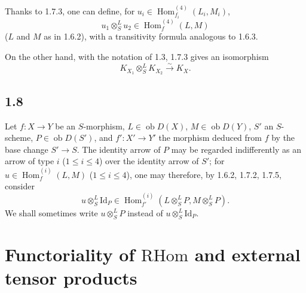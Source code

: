 \documentclass[11pt]{article}
\DeclareMathOperator{\Hom}{Hom}
\newcommand{\ob}{\operatorname{ob}}
\providecommand{\RHom}{\mathrm{RHom}}
\providecommand{\Id}{\mathrm{Id}}
\providecommand{\RHom}{\mathrm{RHom}}
\providecommand{\Hom}{\operatorname{Hom}}
\providecommand{\ob}{\operatorname{ob}}
\providecommand{\RHom}{\mathrm R\mathcal{H}om}
\providecommand{\RHom}{\mathrm{RHom}}
\begin{document}
Thanks to 1.7.3, one can define, for $u_i\in\Hom_{f_i}^{(4)}(L_i,M_i)$,
\begin{equation}\tag{1.7.5}
u_1\otimes^L_Su_2\in\Hom_f^{(4)}(L,M)
\end{equation}
($L$ and $M$ as in 1.6.2), with a transitivity formula analogous to 1.6.3.

On the other hand, with the notation of 1.3, 1.7.3 gives an isomorphism
\begin{equation}\tag{1.7.6}
K_{X_1}\otimes^L_SK_{X_2}\xrightarrow{\sim}K_X.
\end{equation}

\subsection*{1.8}
Let $f:X\to Y$ be an $S$-morphism, $L\in\ob D(X)$, $M\in\ob D(Y)$, $S'$ an $S$-scheme, $P\in\ob D(S')$, and $f':X'\to Y'$ the morphism deduced from $f$ by the base change $S'\to S$. The identity arrow of $P$ may be regarded indifferently as an arrow of type $i$ ($1\leq i\leq4$) over the identity arrow of $S'$; for $u\in\Hom_f^{(i)}(L,M)$ ($1\leq i\leq4$), one may therefore, by 1.6.2, 1.7.2, 1.7.5, consider
\begin{equation}\tag{1.8.1}
u\otimes^L_S\Id_P\in\Hom_{f'}^{(i)}(L\otimes^L_SP,M\otimes^L_SP).
\end{equation}
We shall sometimes write $u\otimes^L_SP$ instead of $u\otimes^L_S\Id_P$.

\section{Functoriality of $\RHom$ and external tensor products}
\end{document}
